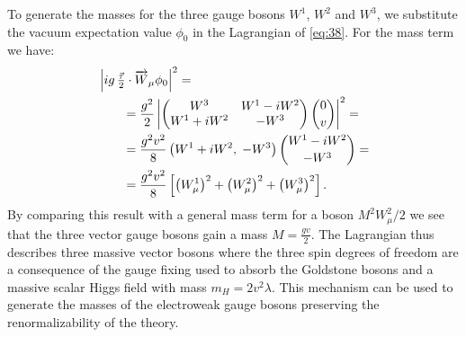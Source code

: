 To generate the masses for the three gauge bosons $W^1$, $W^2$ and $W^3$, we
substitute the vacuum expectation value $\phi_0$ in the Lagrangian of
\cref{eq:38}. For the mass term we have:
\begin{equation}
  \label{eq:44}
  \begin{aligned}[t]
    \MoveEqLeft \left| i g\, \tfrac{\vec \tau}{2} \cdot \vect{W}_{\mu} \phi_{0} \right|^2 =  \\
  &= \frac{g^{2}}{2}
  \left|
    \begin{pmatrix}
      W^{3} & W^{1} - i W^{2} \\
      W^{1} + i W^{2} & - W^{3}
    \end{pmatrix}
    \binom{0}{v} \right|^2 = \\
    &= \frac{g^{2}v^{2}}{8} \left( W^{1} + i W^{2} ,\; - W^{3} \right) \binom{W^{1} -
      i W^{2}}{- W^{3}} = \\
    &= \frac{g^{2} v^{2}}{8} \left[ \left(W_{\mu}^{1} \right)^{2} +
      \left(W_{\mu}^{2} \right)^{2} +
      \left(W_{\mu}^{3} \right)^{2}\right].
  \end{aligned}
\end{equation}
By comparing this result with a general mass term for a boson $M^2 W_\mu^2/2$ we
see that the three vector gauge bosons gain a mass $M = \frac{gv}{2}$. The
Lagrangian thus describes three massive vector bosons where the three spin
degrees of freedom are a consequence of the gauge fixing used to absorb the
Goldstone bosons and a massive scalar Higgs field with mass $m_H =
2v^2\lambda$. This mechanism can be used to generate the masses of the
electroweak gauge bosons preserving the renormalizability of the theory.

